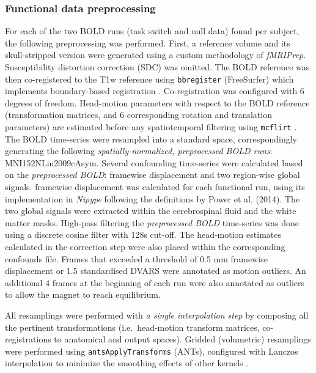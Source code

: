 \documentclass[10pt,letterpaper]{article}
\begin{document}
\subsubsection*{Functional data preprocessing}
\label{methods:func}

For each of the two BOLD runs (task switch and null data) found per subject,
the following preprocessing was performed.
First, a reference volume and its skull-stripped version were generated
using a custom methodology of \emph{fMRIPrep}.
Susceptibility distortion correction (SDC) was omitted.
The BOLD reference was then co-registered to the T1w reference using \texttt{bbregister}
(FreeSurfer) which implements boundary-based registration \cite{bbr}.
Co-registration was configured with 6 degrees of freedom.
Head-motion parameters with respect to the BOLD reference (transformation matrices,
and 6 corresponding rotation and translation parameters) are estimated before any
spatiotemporal filtering using \texttt{mcflirt} \cite[FSL 5.0.9,]{mcflirt}.
The BOLD time-series were resampled into a standard space, correspondingly
generating the following \emph{spatially-normalized, preprocessed BOLD runs}:
MNI152NLin2009cAsym.
Several confounding time-series were calculated based on the \emph{preprocessed BOLD}:
framewise displacement and two region-wise global signals.
framewise displacement was calculated for each functional run, using its
implementation in \emph{Nipype} following the definitions
by Power et al. (2014)\cite{power_fd_dvars}.
The two global signals were extracted within the
cerebrospinal fluid and the white matter masks.
High-pass filtering the \emph{preprocessed BOLD} time-series was done using
a discrete cosine filter with 128s cut-off.
The head-motion estimates calculated in
the correction step were also placed within the corresponding confounds file. 
Frames that exceeded a threshold of 0.5 mm framewise displacement or 1.5 standardised DVARS
were annotated as motion outliers.
An additional 4 frames at the beginning of each run were also
annotated as outliers to allow the magnet to reach equilibrium.

All resamplings were performed with \emph{a single interpolation step} by composing all the pertinent
transformations (i.e.~head-motion transform matrices, co-registrations to anatomical
and output spaces).
Gridded (volumetric) resamplings were performed using \texttt{antsApplyTransforms} (ANTs),
configured with Lanczos interpolation to minimize the smoothing effects of other kernels
\cite{lanczos}.
\end{document}
